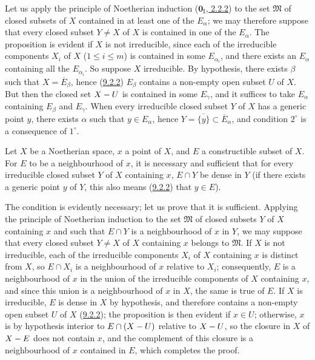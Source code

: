 Let us apply the principle of Noetherian induction
(\hyperref[0.2.2.2]{$\mathbf{0}_{\mathrm I}$, 2.2.2}) to the set
$\mathfrak{M}$ of closed subsets of $X$ contained in at least one of the
$E_\alpha$; we may therefore suppose that every closed subset $Y\ne X$ of $X$ is
contained in one of the $E_\alpha$. The proposition is evident if $X$ is not
irreducible, since each of the irreducible components $X_i$ of $X$
($1\leq i\leq m$) is contained in some $E_{\alpha_i}$, and there exists an
$E_\alpha$ containing all the $E_{\alpha_i}$. So suppose $X$
irreducible. By hypothesis, there exists $\beta$ such that
$X=\overline{E}_\beta$, hence (\hyperref[0.9.2.2]{9.2.2}) $E_\beta$
contains a non-empty open subset $U$ of $X$. But then the closed set
$X- U$ is contained in some $E_\gamma$, and it suffices to take
$E_\alpha$ containing $E_\beta$ and $E_\gamma$. When every irreducible
closed subset $Y$ of $X$
has a generic point $y$, there exists $\alpha$ such that $y\in E_\alpha$,
hence $Y=\overline{\{y\}}\subset\overline{E}_\alpha$, and condition
$2^\circ$ is a consequence of $1^\circ$.

\begin{proposition}[9.2.5]
\label{0.9.2.5}
Let $X$ be a Noetherian space, $x$ a point of $X$, and $E$ a constructible
subset of $X$. For $E$ to be a neighbourhood of $x$, it is necessary and
sufficient that for every irreducible closed subset $Y$ of $X$ containing $x$,
$E\cap Y$ be dense in $Y$ (if there exists a generic point $y$ of $Y$,
this also means \textup{(\hyperref[0.9.2.2]{9.2.2})} that $y\in E$).
\end{proposition}

The condition is evidently necessary; let us prove that it is sufficient.
Applying the principle of Noetherian induction to the set $\mathfrak{M}$
of closed subsets $Y$ of $X$ containing $x$ and such that $E\cap Y$ is a
neighbourhood of $x$ in $Y$, we may suppose that every closed subset $Y\ne X$
of $X$ containing $x$ belongs to $\mathfrak{M}$. If $X$ is not
irreducible, each of the irreducible components $X_i$ of $X$ containing
$x$ is distinct from $X$, so $E\cap X_i$ is a neighbourhood of $x$
relative to $X_i$; consequently, $E$ is a neighbourhood of $x$ in the union of
the irreducible components of $X$ containing $x$, and since this union is a
neighbourhood of $x$ in $X$, the same is true of $E$. If $X$ is
irreducible, $E$ is dense in $X$ by hypothesis, and therefore contains a
non-empty open subset $U$ of $X$ (\hyperref[0.9.2.2]{9.2.2}); the
proposition is then evident if $x\in U$; otherwise, $x$ is by hypothesis
interior to $E\cap(X- U)$ relative to $X- U$, so the closure in
$X$ of $X- E$ does not contain $x$, and the complement of this
closure is a neighbourhood of $x$ contained in $E$, which completes the
proof.

